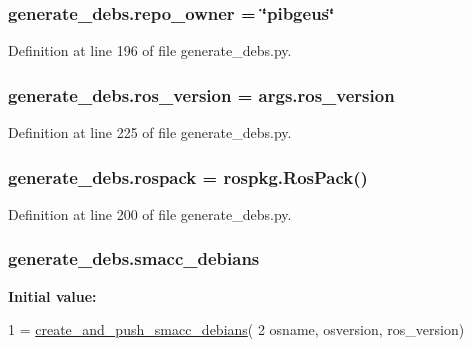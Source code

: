 \subsubsection[{\texorpdfstring{repo\+\_\+owner}{repo_owner}}]{\setlength{\rightskip}{0pt plus 5cm}generate\+\_\+debs.\+repo\+\_\+owner = \char`\"{}pibgeus\char`\"{}}\hypertarget{namespacegenerate__debs_a23479dba5af50c90f3346b04d441ab2b}{}\label{namespacegenerate__debs_a23479dba5af50c90f3346b04d441ab2b}


Definition at line 196 of file generate\+\_\+debs.\+py.

\subsubsection[{\texorpdfstring{ros\+\_\+version}{ros_version}}]{\setlength{\rightskip}{0pt plus 5cm}generate\+\_\+debs.\+ros\+\_\+version = args.\+ros\+\_\+version}\hypertarget{namespacegenerate__debs_af69f35c2a04a4cc8bd6b9805ab436872}{}\label{namespacegenerate__debs_af69f35c2a04a4cc8bd6b9805ab436872}


Definition at line 225 of file generate\+\_\+debs.\+py.

\subsubsection[{\texorpdfstring{rospack}{rospack}}]{\setlength{\rightskip}{0pt plus 5cm}generate\+\_\+debs.\+rospack = rospkg.\+Ros\+Pack()}\hypertarget{namespacegenerate__debs_a609fa33c1ebbff173ec90524eeb7b49d}{}\label{namespacegenerate__debs_a609fa33c1ebbff173ec90524eeb7b49d}


Definition at line 200 of file generate\+\_\+debs.\+py.

\subsubsection[{\texorpdfstring{smacc\+\_\+debians}{smacc_debians}}]{\setlength{\rightskip}{0pt plus 5cm}generate\+\_\+debs.\+smacc\+\_\+debians}\hypertarget{namespacegenerate__debs_a06e0eca4f9d50e67f110b439c402ef44}{}\label{namespacegenerate__debs_a06e0eca4f9d50e67f110b439c402ef44}
{\bfseries Initial value\+:}
\begin{DoxyCode}
1 = \hyperlink{namespacegenerate__debs_af7237c463c8e5b4df369e6befc154c50}{create\_and\_push\_smacc\_debians}(
2         osname, osversion, ros\_version)
\end{DoxyCode}


